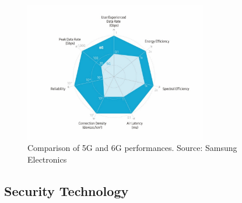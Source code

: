 \documentclass[11pt]{article}
\begin{document}
\begin{figure}[h!]
  \centering
  \vspace*{-0.4cm}
  \includegraphics[width=0.71\textwidth]{samsung-6g.jpg}
  \vspace*{-0.5cm}
  \caption{Comparison of 5G and 6G performances. Source: Samsung Electronics\,\cite{samsungwhitepaper}}
  \label{fig:6g}
\end{figure}


\subsection{Security Technology}

\end{document}
